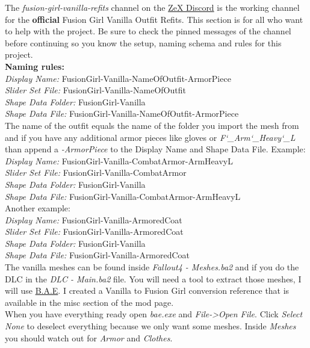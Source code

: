 The \textit{fusion-girl-vanilla-refits} channel on the \href{https://discord.gg/9vBqB9}{ZeX Discord} is the working channel
for the \textbf{official} Fusion Girl Vanilla Outfit Refits. This section is for all who want to help with the 
project. Be sure to check the pinned messages of the channel before continuing so you know the setup, naming schema 
and rules for this project.\\
\textbf{Naming rules:}\\
\textit{Display Name:} FusionGirl-Vanilla-NameOfOutfit-ArmorPiece\\
\textit{Slider Set File:} FusionGirl-Vanilla-NameOfOutfit\\
\textit{Shape Data Folder:} FusionGirl-Vanilla\\
\textit{Shape Data File:} FusionGirl-Vanilla-NameOfOutfit-ArmorPiece\\
The name of the outfit equals the name of the folder you import the mesh from and if you have any additional armor pieces like 
gloves or \textit{F\char`_Arm\char`_Heavy\char`_L} than append a \textit{-ArmorPiece} to the Display Name and Shape Data File. Example:\\
\textit{Display Name:} FusionGirl-Vanilla-CombatArmor-ArmHeavyL\\
\textit{Slider Set File:} FusionGirl-Vanilla-CombatArmor\\
\textit{Shape Data Folder:} FusionGirl-Vanilla\\
\textit{Shape Data File:} FusionGirl-Vanilla-CombatArmor-ArmHeavyL\\
Another example:\\
\textit{Display Name:} FusionGirl-Vanilla-ArmoredCoat\\
\textit{Slider Set File:} FusionGirl-Vanilla-ArmoredCoat\\
\textit{Shape Data Folder:} FusionGirl-Vanilla\\
\textit{Shape Data File:} FusionGirl-Vanilla-ArmoredCoat\\
The vanilla meshes can be found inside \textit{Fallout4 - Meshes.ba2} and if you do the DLC in the \textit{DLC - Main.ba2} file.
You will need a tool to extract those meshes, I will use \href{https://www.nexusmods.com/fallout4/mods/78}{B.A.E}. I created a 
Vanilla to Fusion Girl conversion reference that is available in the misc section of the mod page.\\
When you have everything ready open \textit{bae.exe} and \textit{File->Open File}. Click \textit{Select None} to deselect everything
because we only want some meshes. Inside \textit{Meshes} you should watch out for \textit{Armor} and \textit{Clothes}. 
